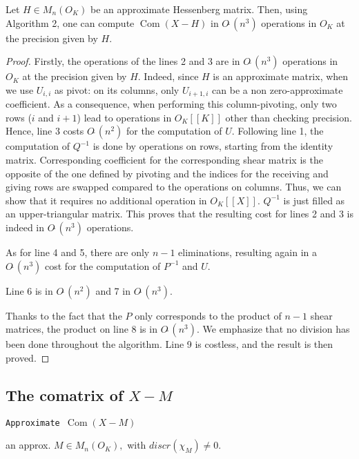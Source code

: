 \documentclass{sig-alternate-05-2015}
\DeclareMathOperator{\com}{Com}
\newcommand{\softO}{O\tilde{~}}
\begin{document}
\begin{theo}
Let $H \in M_n(O_K)$ be an approximate Hessenberg matrix.
Then, using Algorithm 2, one can compute $\com (X -H)$ in 
$\softO (n^3)$ operations in $O_K$ at the precision given by $H.$
\end{theo}
\begin{proof}
Firstly, the operations of the lines 2 and 3 are in $\softO (n^3)$ operations
in $O_K$ at the precision given by $H.$
Indeed, since $H$ is an approximate matrix, when we use $U_{i,i}$ as pivot:
on its columns, only $U_{i+1,i}$ can be a non zero-approximate coefficient.
As a consequence, when performing this column-pivoting, only two rows ($i$ and
$i+1$) lead to operations in $O_K [[K]]$ other than checking precision.
Hence, line 3 costs $\softO (n^2)$ for the computation of $U.$
Following line 1, the computation of $Q^{-1}$ is done by operations on rows, starting from the identity matrix.
Corresponding coefficient for the corresponding shear matrix
 is the opposite of the one defined by pivoting
and the indices for the receiving and giving rows are swapped compared to the operations on columns.
Thus, we can show that it requires no additional operation in $O_K[[X]].$ $Q^{-1}$ is just filled as
an upper-triangular matrix.
This proves that the resulting cost for lines 2 and 3 is indeed in $\softO (n^3)$ operations.

As for line 4 and 5, there are only $n-1$ eliminations, resulting again in a $\softO (n^3)$ cost
for the computation of $P^{-1}$ and $U.$

Line 6 is in $\softO (n^2)$ and 7 in $\softO (n^3).$

Thanks to the fact that the $P$ only corresponds to the product of $n-1$ 
shear matrices, the
product on line 8 is in $\softO (n^3).$
We emphasize that no division has been done throughout the algorithm.
Line 9 is costless, and the result is then proved.
\end{proof}


\subsection{The comatrix of $X{-}M$}



\noindent\hrulefill

 {\tt Approximate $\com (X{-}M)$ }

 an approx. $M \in M_n(O_K),$ with $discr(\chi_M) \neq 0.$ 
\end{document}
